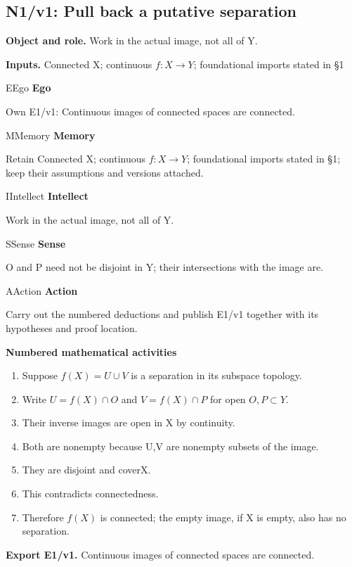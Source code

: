 \documentclass[preprint,12pt,aps,pra,showkeys,amsmath,amssymb,superscriptaddress,floatfix]{revtex4-2}
\theoremstyle{definition}
\theoremstyle{remark}
\newcommand{\mmfaculty}[3]{%
 \begin{mmfacultybox}{#1}{#2}
 {\sffamily\bfseries\color{MMBlue}#2}\par\smallskip #3
 \end{mmfacultybox}}
\newcommand{\field}[2]{\par\smallskip\noindent\textbf{#1.} #2\par}
\begin{document}
\subsection{N1/v1: Pull back a putative separation}

\field{Object and role}{Work in the actual image, not all of Y.}

\field{Inputs}{Connected X; continuous \(f:X\to Y\); foundational imports stated in §1}

\mmfaculty{E}{Ego}{Own E1/v1: Continuous images of connected spaces are connected.}

\mmfaculty{M}{Memory}{Retain Connected X; continuous \(f:X\to Y\); foundational imports stated
in §1; keep their assumptions and versions attached.}

\mmfaculty{I}{Intellect}{Work in the actual image, not all of Y.}

\mmfaculty{S}{Sense}{O and P need not be disjoint in Y; their intersections with the image
are.}

\mmfaculty{A}{Action}{Carry out the numbered deductions and publish E1/v1 together with its
hypotheses and proof location.}

\smallskip\noindent\textbf{Numbered mathematical activities}

\begin{enumerate}[label=N1.\arabic*,leftmargin=3.4em]

\item Suppose \(f(X)=U\cup V\) is a separation in its subspace topology.

\item Write \(U=f(X)\cap O\) and \(V=f(X)\cap P\) for open \(O,P\subset Y\).

\item Their inverse images are open in X by continuity.

\item Both are nonempty because U,V are nonempty subsets of the image.

\item They are disjoint and coverX.

\item This contradicts connectedness.

\item Therefore \(f(X)\) is connected; the empty image, if X is empty, also
has no separation.

\end{enumerate}

\field{Export E1/v1}{Continuous images of connected spaces are connected.}
\end{document}
